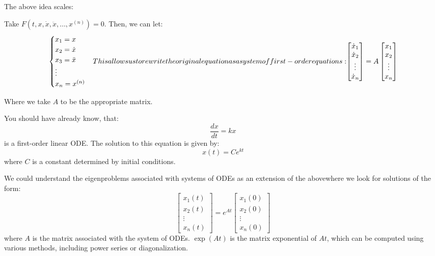 \documentclass[11pt]{article}
\begin{document}
The above idea scales:

\begin{example}
    Take $F(t, x, \dot{x}, \ddot{x}, \ldots, x^{(n)}) = 0$. Then, we can let:
   \begin{equation}
    \begin{cases}
        x_1 = x \\
        x_2 = \dot{x} \\
        x_3 = \ddot{x} \\
        \vdots \\
        x_n = x^{(n)}
    \end{cases}
    $$
    This allows us to rewrite the original equation as a system of first-order equations:
    $$ 
    \begin{bmatrix}
        \dot{x}_1 \\
        \dot{x}_2 \\
        \vdots \\
        \dot{x}_n
    \end{bmatrix}
    =
    A
    \begin{bmatrix}
        x_1 \\
        x_2 \\
        \vdots \\
        x_n
    \end{bmatrix}
\end{equation}

Where we take $A$ to be the appropriate matrix.
\end{example}

\begin{example}
    You should have already know, that:
    $$
    \frac{dx}{dt} = kx
    $$
    is a first-order linear ODE. The solution to this equation is given by:
    $$
    x(t) = Ce^{kt}
    $$
    where \( C \) is a constant determined by initial conditions.

We could understand the eigenproblems associated with systems of ODEs as an extension of the abovewhere we look for solutions of the form:
\begin{equation}
\begin{bmatrix}
x_1(t) \\
x_2(t) \\
\vdots \\
x_n(t)
\end{bmatrix}
=
e^{At}
\begin{bmatrix}
x_1(0) \\
x_2(0) \\
\vdots \\
x_n(0)
\end{bmatrix}
\end{equation}
where \( A \) is the matrix associated with the system of ODEs. $\exp(At)$ is the matrix exponential of \( At \), which can be computed using various methods, including power series or diagonalization.
\end{example}
\end{document}
